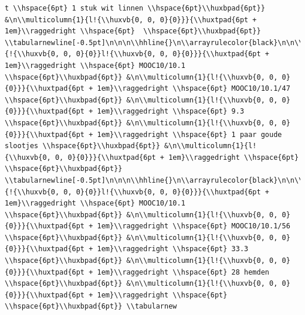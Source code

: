 \documentclass[11pt,preprint, authoryear]{elsarticle}
\numberwithin{equation}{section}
\numberwithin{figure}{section}
\numberwithin{table}{section}
\begin{document}
\begin{verbatim}
t \\hspace{6pt} 1 stuk wit linnen \\hspace{6pt}\\huxbpad{6pt}} &\n\\multicolumn{1}{l!{\\huxvb{0, 0, 0}{0}}}{\\huxtpad{6pt + 1em}\\raggedright \\hspace{6pt}  \\hspace{6pt}\\huxbpad{6pt}} \\tabularnewline[-0.5pt]\n\n\n\\hhline{}\n\\arrayrulecolor{black}\n\n\\multicolumn{1}{!{\\huxvb{0, 0, 0}{0}}l!{\\huxvb{0, 0, 0}{0}}}{\\huxtpad{6pt + 1em}\\raggedright \\hspace{6pt} MOOC10/10.1 \\hspace{6pt}\\huxbpad{6pt}} &\n\\multicolumn{1}{l!{\\huxvb{0, 0, 0}{0}}}{\\huxtpad{6pt + 1em}\\raggedright \\hspace{6pt} MOOC10/10.1/47 \\hspace{6pt}\\huxbpad{6pt}} &\n\\multicolumn{1}{l!{\\huxvb{0, 0, 0}{0}}}{\\huxtpad{6pt + 1em}\\raggedright \\hspace{6pt} 9.3 \\hspace{6pt}\\huxbpad{6pt}} &\n\\multicolumn{1}{l!{\\huxvb{0, 0, 0}{0}}}{\\huxtpad{6pt + 1em}\\raggedright \\hspace{6pt} 1 paar goude slootjes \\hspace{6pt}\\huxbpad{6pt}} &\n\\multicolumn{1}{l!{\\huxvb{0, 0, 0}{0}}}{\\huxtpad{6pt + 1em}\\raggedright \\hspace{6pt}  \\hspace{6pt}\\huxbpad{6pt}} \\tabularnewline[-0.5pt]\n\n\n\\hhline{}\n\\arrayrulecolor{black}\n\n\\multicolumn{1}{!{\\huxvb{0, 0, 0}{0}}l!{\\huxvb{0, 0, 0}{0}}}{\\huxtpad{6pt + 1em}\\raggedright \\hspace{6pt} MOOC10/10.1 \\hspace{6pt}\\huxbpad{6pt}} &\n\\multicolumn{1}{l!{\\huxvb{0, 0, 0}{0}}}{\\huxtpad{6pt + 1em}\\raggedright \\hspace{6pt} MOOC10/10.1/56 \\hspace{6pt}\\huxbpad{6pt}} &\n\\multicolumn{1}{l!{\\huxvb{0, 0, 0}{0}}}{\\huxtpad{6pt + 1em}\\raggedright \\hspace{6pt} 33.3 \\hspace{6pt}\\huxbpad{6pt}} &\n\\multicolumn{1}{l!{\\huxvb{0, 0, 0}{0}}}{\\huxtpad{6pt + 1em}\\raggedright \\hspace{6pt} 28 hemden \\hspace{6pt}\\huxbpad{6pt}} &\n\\multicolumn{1}{l!{\\huxvb{0, 0, 0}{0}}}{\\huxtpad{6pt + 1em}\\raggedright \\hspace{6pt}  \\hspace{6pt}\\huxbpad{6pt}} \\tabularnew
\end{verbatim}
\end{document}
